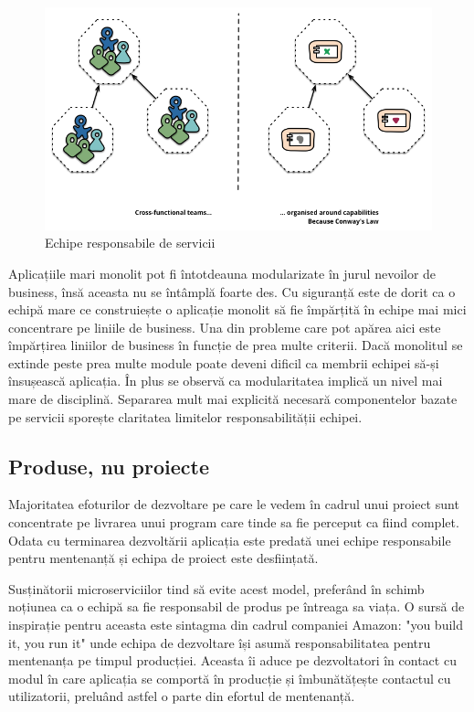 \documentclass[12pt, a4paper, oneside, romanian]{teza-upb}
\begin{document}
\begin{figure}[ht]
\centering
\includegraphics[scale=0.5]{img/cross-functional-team.png}
\caption{Echipe responsabile de servicii}
\label{fig:dist_respo_servicii}
\end{figure}

Aplicațiile mari monolit pot fi întotdeauna modularizate în jurul nevoilor de business, însă aceasta nu se întâmplă foarte des. Cu siguranță este de dorit ca o echipă mare ce construiește o aplicație monolit să fie împărțită în echipe mai mici concentrare pe liniile de business. Una din probleme care pot apărea aici este împărțirea liniilor de business în funcție de prea multe criterii. Dacă monolitul se extinde peste prea multe module poate deveni dificil ca membrii echipei să-și însușească aplicația. În plus se observă ca modularitatea implică un nivel mai mare de disciplină. Separarea mult mai explicită necesară componentelor bazate pe servicii sporește claritatea limitelor responsabilității echipei.

\subsection{Produse, nu proiecte}

Majoritatea efoturilor de dezvoltare pe care le vedem în cadrul unui proiect sunt concentrate pe livrarea unui program care tinde sa fie perceput ca fiind complet. Odata cu terminarea dezvoltării aplicația este predată unei echipe responsabile pentru mentenanță și echipa de proiect este desființată. 

Susținătorii microserviciilor tind să evite acest model, preferând în schimb noțiunea ca o echipă sa fie responsabil de produs pe întreaga sa viața. O sursă de inspirație pentru aceasta este sintagma din cadrul companiei Amazon: "you build it, you run it" unde echipa de dezvoltare își asumă responsabilitatea pentru mentenanța pe timpul producției. Aceasta îi aduce pe dezvoltatori în contact cu modul în care aplicația se comportă în producție și îmbunătățește contactul cu utilizatorii, preluând astfel o parte din efortul de mentenanță. 
\end{document}
